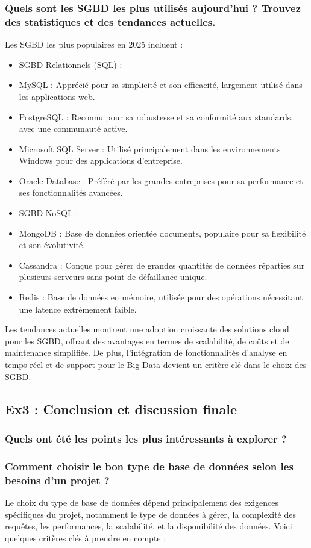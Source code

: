 \documentclass{article}
\begin{document}
\subsubsection{Quels sont les SGBD les plus utilisés aujourd’hui ? Trouvez des statistiques et des tendances 
actuelles.}
Les SGBD les plus populaires en 2025 incluent :
\begin{itemize}
  \item SGBD Relationnels (SQL) :
  \item MySQL : Apprécié pour sa simplicité et son efficacité, largement utilisé dans les applications web.
  \item PostgreSQL : Reconnu pour sa robustesse et sa conformité aux standards, avec une communauté active.
  \item Microsoft SQL Server : Utilisé principalement dans les environnements Windows pour des applications d’entreprise.
  \item Oracle Database : Préféré par les grandes entreprises pour sa performance et ses fonctionnalités avancées.
  \item SGBD NoSQL :
  \item MongoDB : Base de données orientée documents, populaire pour sa flexibilité et son évolutivité.
  \item Cassandra : Conçue pour gérer de grandes quantités de données réparties sur plusieurs serveurs sans point de défaillance unique.
  \item Redis : Base de données en mémoire, utilisée pour des opérations nécessitant une latence extrêmement faible.
\end{itemize}

Les tendances actuelles montrent une adoption croissante des solutions cloud pour les SGBD, offrant des avantages en termes de scalabilité, de coûts et de maintenance simplifiée. De plus, l’intégration de fonctionnalités d’analyse en temps réel et de support pour le Big Data devient un critère clé dans le choix des SGBD.


\subsection{Ex3 : Conclusion et discussion finale}
\subsubsection{Quels ont été les points les plus intéressants à explorer ? }
\subsubsection{Comment choisir le bon type de base de données selon les besoins d’un projet ?}
Le choix du type de base de données dépend principalement des exigences spécifiques du projet, notamment le type de données à gérer, la complexité des requêtes, les performances, la scalabilité, et la disponibilité des données. Voici quelques critères clés à prendre en compte :
\end{document}
